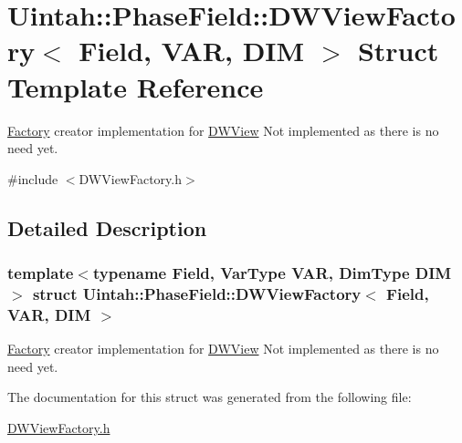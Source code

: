 \hypertarget{structUintah_1_1PhaseField_1_1DWViewFactory}{}\section{Uintah\+:\+:Phase\+Field\+:\+:D\+W\+View\+Factory$<$ Field, V\+AR, D\+IM $>$ Struct Template Reference}
\label{structUintah_1_1PhaseField_1_1DWViewFactory}


\hyperlink{classUintah_1_1PhaseField_1_1Factory}{Factory} creator implementation for \hyperlink{classUintah_1_1PhaseField_1_1DWView}{D\+W\+View} Not implemented as there is no need yet.  




{\ttfamily \#include $<$D\+W\+View\+Factory.\+h$>$}



\subsection{Detailed Description}
\subsubsection*{template$<$typename Field, Var\+Type V\+AR, Dim\+Type D\+IM$>$\newline
struct Uintah\+::\+Phase\+Field\+::\+D\+W\+View\+Factory$<$ Field, V\+A\+R, D\+I\+M $>$}

\hyperlink{classUintah_1_1PhaseField_1_1Factory}{Factory} creator implementation for \hyperlink{classUintah_1_1PhaseField_1_1DWView}{D\+W\+View} Not implemented as there is no need yet. 

The documentation for this struct was generated from the following file\+:\begin{DoxyCompactItemize}
\item 
\hyperlink{DWViewFactory_8h}{D\+W\+View\+Factory.\+h}\end{DoxyCompactItemize}
